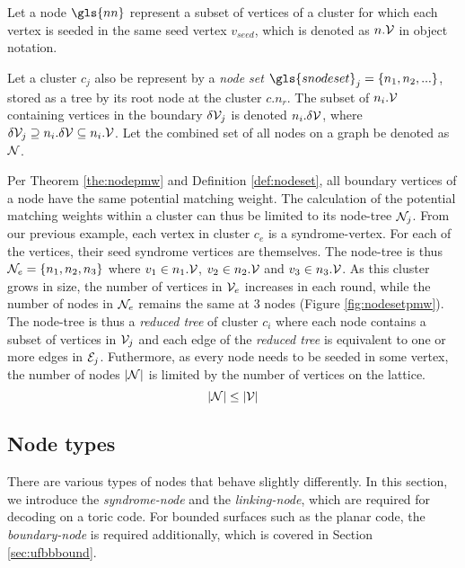\begin{definition}\label{def:node}
  Let a node $\gls{nn}$ represent a subset of vertices of a cluster for which each vertex is seeded in the same seed vertex $v_{seed}$, which is denoted as $n.\mathcal{V}$ in object notation. 
\end{definition}

\begin{definition}\label{def:nodeset}
  Let a cluster $c_j$ also be represent by a \emph{node set} $\gls{snodeset}_j = \{n_1, n_2, ...\}$, stored as a tree by its root node at the cluster $c.n_r$. The subset of $n_i.\mathcal{V}$ containing vertices in the boundary $\delta\mathcal{V}_j$ is denoted $n_i.\delta\mathcal{V}$, where $\delta\mathcal{V}_j \supseteq n_i.\delta\mathcal{V} \subseteq n_i.\mathcal{V}$. Let the combined set of all nodes on a graph be denoted as $\mathcal{N}$.
\end{definition}

Per Theorem \ref{the:nodepmw} and Definition \ref{def:nodeset}, all boundary vertices of a node have the same potential matching weight. The calculation of the potential matching weights within a cluster can thus be limited to its node-tree $\mathcal{N}_j$. From our previous example, each vertex in cluster $c_e$ is a syndrome-vertex. For each of the vertices, their seed syndrome vertices are themselves. The node-tree is thus $\mathcal{N}_e = \{n_1, n_2, n_3\}$ where $v_1 \in n_1.\mathcal{V}$, $v_2 \in n_2.\mathcal{V}$ and $v_3 \in n_3.\mathcal{V}$. As this cluster grows in size, the number of vertices in $\mathcal{V}_e$ increases in each round, while the number of nodes in $\mathcal{N}_e$ remains the same at 3 nodes (Figure \ref{fig:nodesetpmw}). The node-tree is thus a \emph{reduced tree} of cluster $c_i$ where each node contains a subset of vertices in $\mathcal{V}_j$ and each edge of the \emph{reduced tree} is equivalent to one or more edges in $\mathcal{E}_j$. Futhermore, as every node needs to be seeded in some vertex, the number of nodes $|\mathcal{N}|$ is limited by the number of vertices on the lattice. 
\begin{equation}\label{eq:sets}  
  \abs{\mathcal{N}} \leq \abs{\mathcal{V}} 
\end{equation}


\subsection{Node types}

There are various types of nodes that behave slightly differently. In this section, we introduce the \emph{syndrome-node} and the \emph{linking-node}, which are required for decoding on a toric code. For bounded surfaces such as the planar code, the \emph{boundary-node} is required additionally, which is covered in Section \ref{sec:ufbbbound}. 

